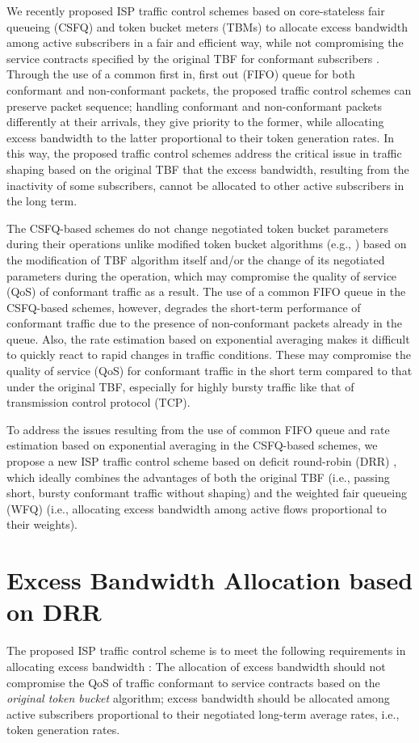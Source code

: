 \documentclass[conference,twoside,final]{IEEEtran}
\begin{document}
We recently proposed ISP traffic control schemes based on core-stateless fair
queueing (CSFQ) \cite{stoica03:_core} and token bucket meters (TBMs) to allocate
excess bandwidth among active subscribers in a fair and efficient way, while not
compromising the service contracts specified by the original TBF for conformant
subscribers \cite{Kim:14-1}. Through the use of a common first in, first out
(FIFO) queue for both conformant and non-conformant packets, the proposed
traffic control schemes can preserve packet sequence; handling conformant and
non-conformant packets differently at their arrivals, they give priority to the
former, while allocating excess bandwidth to the latter proportional to their
token generation rates. In this way, the proposed traffic control schemes
address the critical issue in traffic shaping based on the original TBF that the
excess bandwidth, resulting from the inactivity of some subscribers, cannot be
allocated to other active subscribers in the long term.

The CSFQ-based schemes do not change negotiated token bucket parameters during
their operations unlike modified token bucket algorithms (e.g.,
\cite{abendroth06:_solvin}) based on the modification of TBF algorithm itself
and/or the change of its negotiated parameters during the operation, which may
compromise the quality of service (QoS) of conformant traffic as a result.  The
use of a common FIFO queue in the CSFQ-based schemes, however, degrades the
short-term performance of conformant traffic due to the presence of
non-conformant packets already in the queue. Also, the rate estimation based on
exponential averaging makes it difficult to quickly react to rapid changes in
traffic conditions. These may compromise the quality of service (QoS) for
conformant traffic in the short term compared to that under the original TBF,
especially for highly bursty traffic like that of transmission control protocol
(TCP).

To address the issues resulting from the use of common FIFO queue and rate
estimation based on exponential averaging in the CSFQ-based schemes, we propose
a new ISP traffic control scheme based on deficit round-robin (DRR)
\cite{Shreedhar:96-1}, which ideally combines the advantages of both the
original TBF (i.e., passing short, bursty conformant traffic without shaping)
and the weighted fair queueing (WFQ) (i.e., allocating excess bandwidth among
active flows proportional to their weights).

\section{Excess Bandwidth Allocation based on DRR}
\label{sec-2}
The proposed ISP traffic control scheme is to meet the following requirements in
allocating excess bandwidth \cite{Kim:14-1}: The allocation of excess bandwidth
should not compromise the QoS of traffic conformant to service contracts based
on the \textit{original token bucket} algorithm; excess bandwidth should be
allocated among active subscribers proportional to their negotiated long-term
average rates, i.e., token generation rates.
\end{document}
